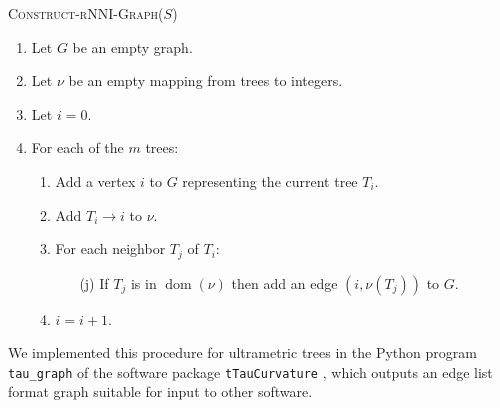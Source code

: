 \documentclass{amsart}
\theoremstyle{definition}
\newcommand{\rnni}{\mathrm{rNNI}}
\newcommand{\dom}{\operatorname{dom}}
\begin{document}
\textsc{Construct-$\rnni$-Graph($S$)}
\begin{enumerate}[1.]
	\item Let $G$ be an empty graph.
	\item Let $\nu$ be an empty mapping from trees to integers.
	\item Let $i = 0$.
	\item For each of the $m$ trees: \vspace{-0.2em}
		\begin{enumerate}
			\item Add a vertex $i$ to $G$ representing the current tree $T_i$.
			\item Add $T_i \rightarrow i$ to $\nu$.
			\item For each neighbor $T_j$ of $T_i$:
				\begin{enumerate}
					\item[(j)] If $T_j$ is in $\dom(\nu)$ then add an edge $(i, \nu(T_j))$ to $G$.
				\end{enumerate}
		\item $i = i + 1$.
		\end{enumerate}
\end{enumerate}

We implemented this procedure for ultrametric trees in the Python program \texttt{tau\_graph}
of the software package \texttt{tTauCurvature} \autocite{tTauCurvature},
which outputs an edge list format graph suitable for input to other software.


\iftoggle{curvatureON}{
\section{Some other spaces}

Several important proposal mechanisms used in phylogenetic Bayesian inference by popular software packages such as BEAST2 \autocite{beast2} favor topological moves or tree moves depending on various conditions.
All tree moves we have been considering so far do not make an explicit distinction between topological changes and branch length changes.
To address this issue\todo{issue?}, we consider the following tree move that explicitly allows distributing the acceptance probability between topological and branch length moves.

{\bf Lazy walk.}
Let $p$ be the laziness probability, that is, we do nothing with probability $1-p$ and distribute the probability $p$ as follows.
We decide first on what type of move we want to perform: choose a topological move with probability $q$ and a length move otherwise, that is, $q \leq p$ and the probability of a length move is $p-q$.
The proposal is rejected if a topological move is impossible.

{\bf tau move.}
Choose a coordinate uniformly at random.
Increase the coordinate by $1$ with probability $p$ and decrease it by $1$ otherwise.
If the coordinate becomes $0$, resolve the multifurcation uniformly at random and set the new coordinate to $1$.
Note that this mechanism does not bound edge lengths from above and favors topological moves when $p<1/2$.
}{}
\end{document}
